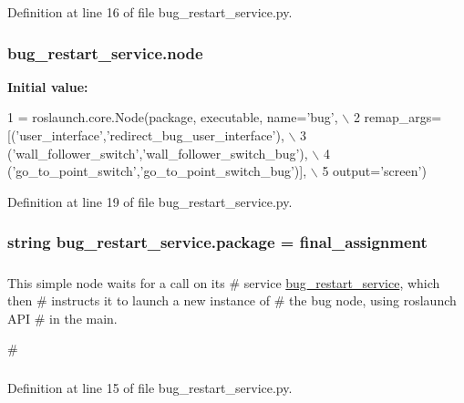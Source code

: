 Definition at line 16 of file bug\+\_\+restart\+\_\+service.\+py.

\subsubsection[{\texorpdfstring{node}{node}}]{\setlength{\rightskip}{0pt plus 5cm}bug\+\_\+restart\+\_\+service.\+node}\hypertarget{namespacebug__restart__service_a42bb9af0de4ac22222ad7dc5a12018be}{}\label{namespacebug__restart__service_a42bb9af0de4ac22222ad7dc5a12018be}
{\bfseries Initial value\+:}
\begin{DoxyCode}
1 = roslaunch.core.Node(package, executable, name=\textcolor{stringliteral}{'bug'}, \(\backslash\)
2                     remap\_args= [(\textcolor{stringliteral}{'user\_interface'},\textcolor{stringliteral}{'redirect\_bug\_user\_interface'}), \(\backslash\)
3                                 (\textcolor{stringliteral}{'wall\_follower\_switch'},\textcolor{stringliteral}{'wall\_follower\_switch\_bug'}), \(\backslash\)
4                                 (\textcolor{stringliteral}{'go\_to\_point\_switch'},\textcolor{stringliteral}{'go\_to\_point\_switch\_bug'})], \(\backslash\)
5                                 output=\textcolor{stringliteral}{'screen'})
\end{DoxyCode}


Definition at line 19 of file bug\+\_\+restart\+\_\+service.\+py.

\subsubsection[{\texorpdfstring{package}{package}}]{\setlength{\rightskip}{0pt plus 5cm}string bug\+\_\+restart\+\_\+service.\+package = \textquotesingle{}final\+\_\+assignment\textquotesingle{}}\hypertarget{namespacebug__restart__service_a111ac98f73b77147bc204f0de607151c}{}\label{namespacebug__restart__service_a111ac98f73b77147bc204f0de607151c}


\subparagraph*{}

This simple node waits for a call on its \# service \textquotesingle{}\hyperlink{namespacebug__restart__service}{bug\+\_\+restart\+\_\+service}\textquotesingle{}, which then \# instructs it to launch a new instance of \# the \textquotesingle{}bug\textquotesingle{} node, using \textquotesingle{}roslaunch\textquotesingle{} A\+PI \# in the \textquotesingle{}main\textquotesingle{}. 

\# \subparagraph*{}

Definition at line 15 of file bug\+\_\+restart\+\_\+service.\+py.

